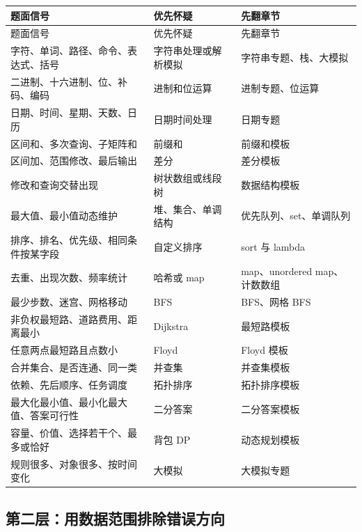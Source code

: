 \begin{longtable}{p{4.2cm}p{4.8cm}p{5cm}}
\toprule
题面信号 & 优先怀疑 & 先翻章节 \\
\midrule
\endfirsthead
\toprule
题面信号 & 优先怀疑 & 先翻章节 \\
\midrule
\endhead
字符、单词、路径、命令、表达式、括号 & 字符串处理或解析模拟 & 字符串专题、栈、大模拟 \\
二进制、十六进制、位、补码、编码 & 进制和位运算 & 进制专题、位运算 \\
日期、时间、星期、天数、日历 & 日期时间处理 & 日期专题 \\
区间和、多次查询、子矩阵和 & 前缀和 & 前缀和模板 \\
区间加、范围修改、最后输出 & 差分 & 差分模板 \\
修改和查询交替出现 & 树状数组或线段树 & 数据结构模板 \\
最大值、最小值动态维护 & 堆、集合、单调结构 & 优先队列、set、单调队列 \\
排序、排名、优先级、相同条件按某字段 & 自定义排序 & sort 与 lambda \\
去重、出现次数、频率统计 & 哈希或 map & map、unordered map、计数数组 \\
最少步数、迷宫、网格移动 & BFS & BFS、网格 BFS \\
非负权最短路、道路费用、距离最小 & Dijkstra & 最短路模板 \\
任意两点最短路且点数小 & Floyd & Floyd 模板 \\
合并集合、是否连通、同一类 & 并查集 & 并查集模板 \\
依赖、先后顺序、任务调度 & 拓扑排序 & 拓扑排序模板 \\
最大化最小值、最小化最大值、答案可行性 & 二分答案 & 二分答案模板 \\
容量、价值、选择若干个、最多或恰好 & 背包 DP & 动态规划模板 \\
规则很多、对象很多、按时间变化 & 大模拟 & 大模拟专题 \\
\bottomrule
\end{longtable}

\subsection{第二层：用数据范围排除错误方向}

